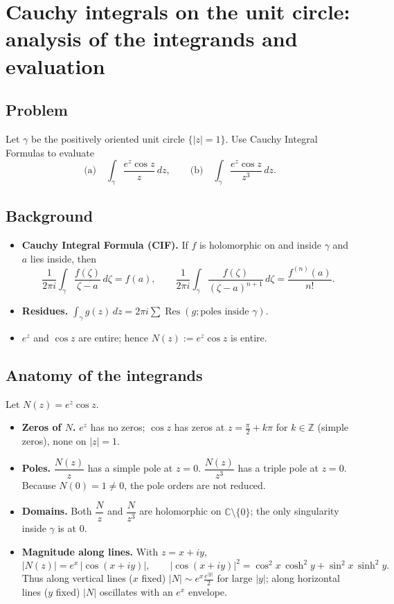 \documentclass[11pt]{article}
\begin{document}
	\section*{Cauchy integrals on the unit circle: analysis of the integrands and evaluation}
	
	\subsection*{Problem}
	Let $\gamma$ be the positively oriented unit circle $\{|z|=1\}$. Use Cauchy Integral Formulas to evaluate
	\[
	\text{(a)}\quad \int_{\gamma}\frac{e^{z}\cos z}{z}\,dz,
	\qquad
	\text{(b)}\quad \int_{\gamma}\frac{e^{z}\cos z}{z^{3}}\,dz.
	\]
	
	\subsection*{Background}
	\begin{itemize}
		\item \textbf{Cauchy Integral Formula (CIF).} If $f$ is holomorphic on and inside $\gamma$ and $a$ lies inside, then
		\[
		\frac{1}{2\pi i}\int_{\gamma}\frac{f(\zeta)}{\zeta-a}\,d\zeta=f(a),
		\qquad
		\frac{1}{2\pi i}\int_{\gamma}\frac{f(\zeta)}{(\zeta-a)^{n+1}}\,d\zeta=\frac{f^{(n)}(a)}{n!}.
		\]
		\item \textbf{Residues.} $\displaystyle \int_{\gamma}g(z)\,dz=2\pi i\sum \operatorname{Res}(g;\text{poles inside }\gamma)$.
		\item $e^{z}$ and $\cos z$ are entire; hence $N(z):=e^{z}\cos z$ is entire.
	\end{itemize}
	
	\subsection*{Anatomy of the integrands}
	Let $N(z)=e^{z}\cos z$.
	\begin{itemize}
		\item \textbf{Zeros of $N$.} $e^{z}$ has no zeros; $\cos z$ has zeros at $z=\frac{\pi}{2}+k\pi$ for $k\in\mathbb{Z}$ (simple zeros), none on $|z|=1$.
		\item \textbf{Poles.} $\dfrac{N(z)}{z}$ has a simple pole at $z=0$. $\dfrac{N(z)}{z^{3}}$ has a triple pole at $z=0$. Because $N(0)=1\neq0$, the pole orders are not reduced.
		\item \textbf{Domains.} Both $\dfrac{N}{z}$ and $\dfrac{N}{z^{3}}$ are holomorphic on $\mathbb{C}\setminus\{0\}$; the only singularity inside $\gamma$ is at $0$.
		\item \textbf{Magnitude along lines.} With $z=x+iy$,
		\[
		|N(z)|=e^{x}\,|\cos(x+iy)|,\qquad
		|\cos(x+iy)|^{2}=\cos^{2}x\,\cosh^{2}y+\sin^{2}x\,\sinh^{2}y.
		\]
		Thus along vertical lines ($x$ fixed) $|N|\sim e^{x}\tfrac{e^{|y|}}{2}$ for large $|y|$; along horizontal lines ($y$ fixed) $|N|$ oscillates with an $e^{x}$ envelope.
	\end{itemize}
	
\end{document}
